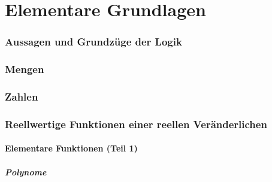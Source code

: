 





\maketitle
\newpage
\tableofcontents
\newpage


\part{Elementare Grundlagen}

\section{Aussagen und Grundzüge der Logik}


\section{Mengen}\label{sec:Mengen}


\section{Zahlen}


\section{Reellwertige Funktionen einer reellen Veränderlichen}
\subsection{Elementare Funktionen (Teil 1)}
\subsubsection{Polynome}
